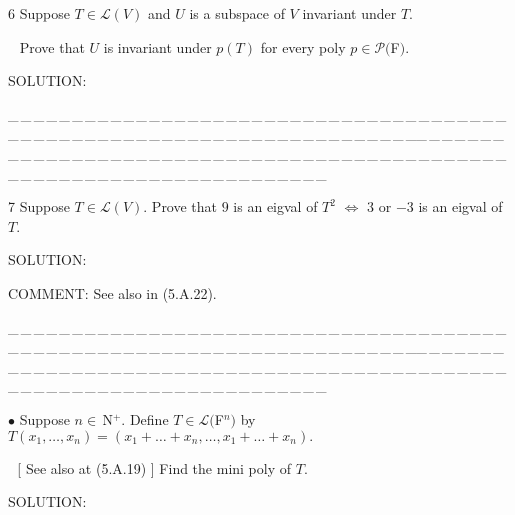 \documentclass[a4paper, 11pt, UTF8]{article}
\def\Lm{\mathcal{L}}
\def\Po{\mathcal{P}}
\def\Nbp{$\,{\timesbf N}$^+}
\begin{document}
\begin{large}
{\timesbf\Large 6} {\timessl\Large 
Suppose $T\in\Lm(V)$ and $U$ is a subspace of $V$ invariant under $T$.}\par\,\,\,
{\timessl\Large Prove that $U$ is invariant under $p(T)$ for every poly $p\in\Po(${\timesbf F}$)$.
}\par
{\timesbf S\footnotesize{OLUTION:}}\par\quad

\par
{\tiny \_\,\_\,\_\,\_\,\_\,\_\,\_\,\_\,\_\,\_\,\_\,\_\,\_\,\_\,\_\,\_\,\_\,\_\,\_\,\_\,\_\,\_\,\_\,\_\,\_\,\_\,\_\,\_\,\_\,\_\,\_\,\_\,\_\,\_\,\_\,\_\,\_\,\_\,\_\,\_\,\_\,\_\,\_\,\_\,\_\,\_\,\_\,\_\,\_\,\_\,\_\,\_\,\_\,\_\,\_\,\_\,\_\,\_\,\_\,\_\,\_\,\_\,\_\,\_\,\_\,\_\,\_\,\_\,\_\,\_\,\_\_\,\_\,\_\,\_\,\_\,\_\,\_\,\_\,\_\,\_\,\_\,\_\,\_\,\_\,\_\,\_\,\_\,\_\,\_\,\_\,\_\,\_\,\_\,\_\,\_\,\_\,\_\,\_\,\_\,\_\,\_\,\_\,\_\,\_\,\_\,\_\,\_\,\_\,\_\,\_\,\_\,\_\,\_\,\_\,\_\,\_\,\_\,\_\,\_\,\_\,\_\,\_\,\_\,\_\,\_\,\_\,\_\,\_\,\_\,\_\,\_\,\_\,\_\,\_\,\_\,\_\,\_\,\_\,\_\,\_\,\_}\par

{\timesbf\Large 7} {\timessl\Large 
Suppose $T\in\Lm(V)$. Prove that $9$ is an eigval of $T^2$ $\Longleftrightarrow$ $3$ or $-3$ is an eigval of $T$.}\par
{\timesbf S\footnotesize{OLUTION:}}\par\quad


C{\small OMMENT:} See also in (5.A.22).
\par
{\tiny \_\,\_\,\_\,\_\,\_\,\_\,\_\,\_\,\_\,\_\,\_\,\_\,\_\,\_\,\_\,\_\,\_\,\_\,\_\,\_\,\_\,\_\,\_\,\_\,\_\,\_\,\_\,\_\,\_\,\_\,\_\,\_\,\_\,\_\,\_\,\_\,\_\,\_\,\_\,\_\,\_\,\_\,\_\,\_\,\_\,\_\,\_\,\_\,\_\,\_\,\_\,\_\,\_\,\_\,\_\,\_\,\_\,\_\,\_\,\_\,\_\,\_\,\_\,\_\,\_\,\_\,\_\,\_\,\_\,\_\,\_\_\,\_\,\_\,\_\,\_\,\_\,\_\,\_\,\_\,\_\,\_\,\_\,\_\,\_\,\_\,\_\,\_\,\_\,\_\,\_\,\_\,\_\,\_\,\_\,\_\,\_\,\_\,\_\,\_\,\_\,\_\,\_\,\_\,\_\,\_\,\_\,\_\,\_\,\_\,\_\,\_\,\_\,\_\,\_\,\_\,\_\,\_\,\_\,\_\,\_\,\_\,\_\,\_\,\_\,\_\,\_\,\_\,\_\,\_\,\_\,\_\,\_\,\_\,\_\,\_\,\_\,\_\,\_\,\_\,\_\,\_}\par

{\small $\bullet$} {\timessl\Large 
Suppose $n\in\Nbp$. Define $T\in\Lm(${\timesbf F}$^{n})$ by $T(x_1,\dots,x_n)=(x_1+\dots+x_n,\dots,x_1+\dots+x_n).$}\par\,\,
[ {\timessl See also at }(5.A.19) ] {\timessl\Large Find the mini poly of $T$.}\par
{\timesbf S\footnotesize{OLUTION:}}\par\quad


\end{large}
\end{document}
